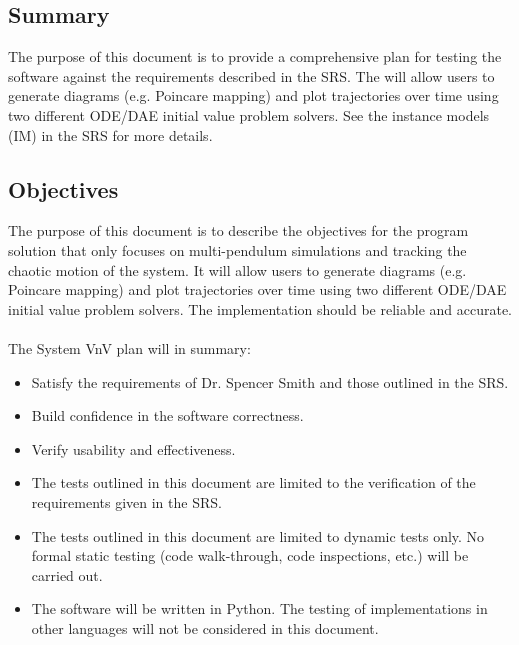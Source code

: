 \documentclass[12pt, titlepage]{article}
\begin{document}
\subsection{Summary}

The purpose of this document is to provide a comprehensive plan for testing the 
\progname software against the requirements described in the
\progname SRS. 
The \progname will allow users to generate diagrams (e.g. Poincare
mapping)
and plot trajectories over time using two different ODE/DAE initial value
problem solvers. See the instance models (IM) in the SRS for more details.


\subsection{Objectives}
The purpose of this document is to describe the objectives for the
\progname program solution that
only focuses on multi-pendulum simulations and tracking the chaotic
motion of the system. It will allow users to generate diagrams (e.g. Poincare
mapping) and plot trajectories over time using two different ODE/DAE initial 
value problem solvers. The implementation should be reliable and accurate.\\\\
The System VnV plan will in summary:
\begin{itemize}
\item Satisfy the requirements of Dr. Spencer Smith and those
  outlined in the SRS.
\item Build confidence in the software correctness.
\item Verify usability and effectiveness.
\item The tests outlined in this document are limited to the verification of 
the requirements given in the \progname SRS.
\item The tests outlined in this document are limited to dynamic tests only.  
No formal static testing (code walk-through, code inspections, etc.) will be 
carried out.
\item The \progname software will be written in Python. The testing of 
implementations in other languages will not be considered in this document.
\end{itemize}
\end{document}
